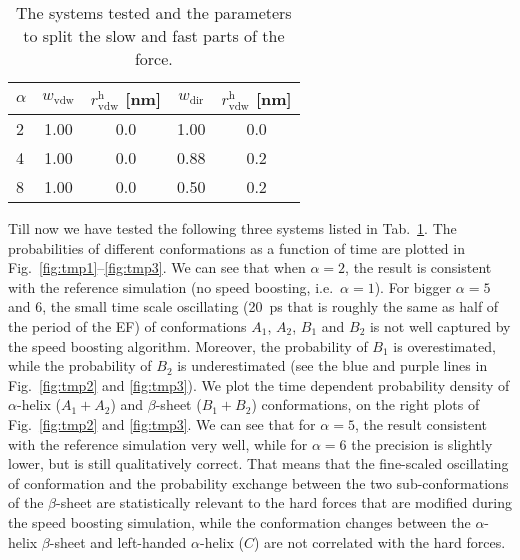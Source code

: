 \documentclass[aip,jcp,a4paper,reprint,onecolumn]{revtex4-1}
\newcommand{\hard}{\textrm{h}}
\newcommand{\vdw}{\textrm{vdw}}
\newcommand{\dir}{\textrm{dir}}
\begin{document}
\begin{table}
  \centering
  \begin{tabular*}{0.48\textwidth}{@{\extracolsep{\fill}}lcccc}
    \hline\hline
    $\alpha$ & $w_\vdw$ & $r^\hard_\vdw$ [nm] & $w_\dir$ & $r^\hard_\vdw$ [nm] \\\hline
    2           & 1.00     & 0.0   & 1.00    & 0.0\\
    4           & 1.00     & 0.0   & 0.88    & 0.2\\
    8           & 1.00     & 0.0   & 0.50    & 0.2\\
    \hline\hline
  \end{tabular*}
  \caption{The systems tested and the parameters to split the slow and fast parts of the force.}
  \label{tab:tmp1}
\end{table}


\noindent
Till now we have tested the following three systems listed in
Tab.~\ref{tab:tmp1}. The probabilities of different conformations as a
function of time are plotted in Fig.~\ref{fig:tmp1}--\ref{fig:tmp3}.
We can see that when $\alpha = 2$, the result is consistent with the
reference simulation (no speed boosting, i.e.~$\alpha = 1$). For
bigger $\alpha = 5$ and 6, the small time scale oscillating (20~ps
that is roughly the same as half of the period of the EF) of
conformations $A_1$, $A_2$, $B_1$ and $B_2$ is not well captured by
the speed boosting algorithm. Moreover, the probability of $B_1$ is
overestimated, while the probability of $B_2$ is underestimated (see
the blue and purple lines in Fig.~\ref{fig:tmp2} and \ref{fig:tmp3}).
We plot the time dependent probability density of $\alpha$-helix
($A_1+A_2$) and $\beta$-sheet ($B_1+B_2$) conformations, on the right
plots of Fig.~\ref{fig:tmp2} and \ref{fig:tmp3}. We can see that for
$\alpha=5$, the result consistent with the reference simulation very
well, while for $\alpha=6$ the precision is slightly lower, but is
still qualitatively correct.  That means that the fine-scaled
oscillating of conformation and the probability exchange between the
two sub-conformations of the $\beta$-sheet are statistically relevant
to the hard forces that are modified during the speed boosting
simulation, while the conformation changes between the $\alpha$-helix
$\beta$-sheet and left-handed $\alpha$-helix ($C$)  are not correlated
with the hard forces.
\end{document}
